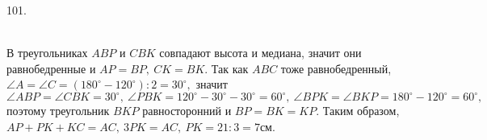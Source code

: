 101. \begin{figure}[ht!]
\end{figure}\\
В треугольниках $ABP$ и $CBK$ совпадают высота и медиана, значит они равнобедренные и $AP=BP,\ CK=BK.$ Так как $ABC$ тоже равнобедренный, $\angle A=\angle C=(180^\circ-120^\circ):2=30^\circ,$ значит $\angle ABP=\angle CBK=30^\circ,\ \angle PBK=120^\circ-30^\circ-30^\circ=60^\circ,\ \angle BPK=\angle BKP=180^\circ-120^\circ=60^\circ,$ поэтому треугольник $BKP$ равносторонний и $BP=BK=KP.$ Таким образом, $AP+PK+KC=AC,\ 3PK=AC,\ PK=21:3=7$см.\\

